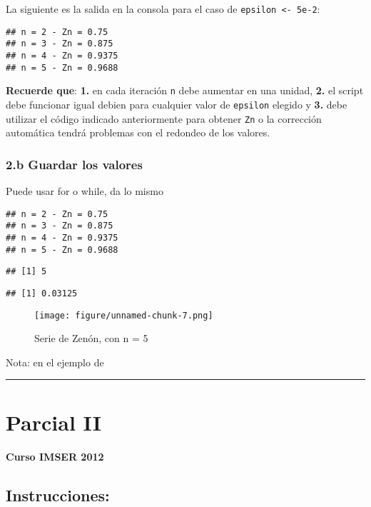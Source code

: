 \documentclass[]{article}
\makeatletter
\def\maxwidth{\ifdim\Gin@nat@width>\linewidth\linewidth
\else\Gin@nat@width\fi}
\let\Oldincludegraphics\includegraphics
\renewcommand{\includegraphics}[1]{\Oldincludegraphics[width=\maxwidth]{#1}}
\makeatother
\begin{document}
La siguiente es la salida en la consola para el caso de
\texttt{epsilon \textless{}- 5e-2}:

\begin{verbatim}
## n = 2 - Zn = 0.75 
## n = 3 - Zn = 0.875 
## n = 4 - Zn = 0.9375 
## n = 5 - Zn = 0.9688
\end{verbatim}
\textbf{Recuerde que}: \textbf{1.} en cada iteración \texttt{n} debe
aumentar en una unidad, \textbf{2.} el script debe funcionar igual
debien para cualquier valor de \texttt{epsilon} elegido y \textbf{3.}
debe utilizar el código indicado anteriormente para obtener \texttt{Zn}
o la corrección automática tendrá problemas con el redondeo de los
valores.

\subsubsection{2.b Guardar los valores}

Puede usar for o while, da lo mismo

\begin{verbatim}
## n = 2 - Zn = 0.75 
## n = 3 - Zn = 0.875 
## n = 4 - Zn = 0.9375 
## n = 5 - Zn = 0.9688
\end{verbatim}
\begin{verbatim}
## [1] 5
\end{verbatim}
\begin{verbatim}
## [1] 0.03125
\end{verbatim}
\begin{figure}[htbp]
\centering
\texttt{[image: figure/unnamed-chunk-7.png]}
\caption{Serie de Zenón, con n = 5}
\end{figure}

Nota: en el ejemplo de

\begin{center}\rule{3in}{0.4pt}\end{center}

\section{Parcial II}

\paragraph{Curso IMSER 2012}

\subsection{Instrucciones:}
\end{document}
